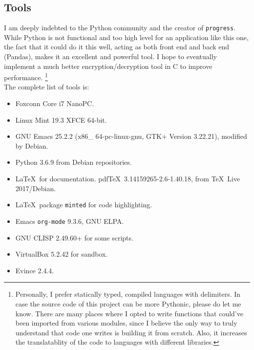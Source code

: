 \documentclass[titlepage]{article}
\begin{document}
\subsection{Tools}
I am deeply indebted to the Python community and the creator of \texttt{progress}. While Python
is not functional and too high level for an application like this one, the fact that it could do it
this well, acting as both front end and back end (Pandas), makes it an excellent and powerful tool.
I hope to eventually implement a much better encryption/decryption tool in C to improve performance.
\footnote{Personally, I prefer statically typed, compiled languages with delimiters. In case the
source code of this project can be more Pythonic, please do let me know. There are many places where
I opted to write functions that could've been imported from various modules, since I believe the
only way to truly understand that code one writes is building it from scratch. Also, it increases
the translatablity of the code to languages with different libraries.} \\

The complete list of tools is:
\begin{multicols}{3}
\begin{itemize}
\item Foxconn Core i7 NanoPC.
\item Linux Mint 19.3 XFCE 64-bit.
\item GNU Emacs 25.2.2 (x86\_ 64-pc-linux-gnu, GTK+ Version 3.22.21),
  modified by Debian.
\item Python 3.6.9 from Debian repositories.
\item \LaTeX\ for documentation. pdf\TeX\ 3.14159265-2.6-1.40.18, from
  \TeX\ Live 2017/Debian.
\item \LaTeX\ package \texttt{minted} for code highlighting.
\item Emacs \texttt{org-mode} 9.3.6, GNU ELPA.
\item GNU CLISP 2.49.60+ for some scripts.
\item VirtualBox 5.2.42 for sandbox.
\item Evince 2.4.4.
\end{itemize}
\end{multicols}
\end{document}
